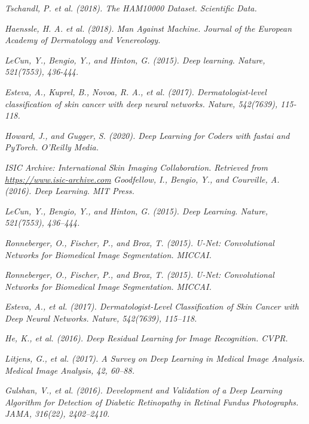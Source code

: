 \documentclass[a4paper,12pt]{report}
\begin{document}
\begin{spacing}{1.5}
\begin{thebibliography}{99}
 \emph{Tschandl, P. et al. (2018). The HAM10000 Dataset. Scientific Data.}

 \emph{Haenssle, H. A. et al. (2018). Man Against Machine. Journal of the European Academy of Dermatology and Venereology.}

 \emph{LeCun, Y., Bengio, Y., and Hinton, G. (2015). Deep learning. Nature, 521(7553), 436-444.}

 \emph{Esteva, A., Kuprel, B., Novoa, R. A., et al. (2017). Dermatologist-level classification of skin cancer with deep neural networks. Nature, 542(7639), 115-118.}

 \emph{Howard, J., and Gugger, S. (2020). Deep Learning for Coders with fastai and PyTorch. O'Reilly Media.}

 \emph{ISIC Archive: International Skin Imaging Collaboration. Retrieved from \url{https://www.isic-archive.com}}
 \emph{Goodfellow, I., Bengio, Y., and Courville, A. (2016). Deep Learning. MIT Press.}

 \emph{LeCun, Y., Bengio, Y., and Hinton, G. (2015). Deep Learning. Nature, 521(7553), 436–444.}

 \emph{Ronneberger, O., Fischer, P., and Brox, T. (2015). U-Net: Convolutional Networks for Biomedical Image Segmentation. MICCAI.}

 \emph{Ronneberger, O., Fischer, P., and Brox, T. (2015). U-Net: Convolutional Networks for Biomedical Image Segmentation. MICCAI.}

 \emph{Esteva, A., et al. (2017). Dermatologist-Level Classification of Skin Cancer with Deep Neural Networks. Nature, 542(7639), 115–118.}

 \emph{He, K., et al. (2016). Deep Residual Learning for Image Recognition. CVPR.}

 \emph{Litjens, G., et al. (2017). A Survey on Deep Learning in Medical Image Analysis. Medical Image Analysis, 42, 60–88.}

 \emph{Gulshan, V., et al. (2016). Development and Validation of a Deep Learning Algorithm for Detection of Diabetic Retinopathy in Retinal Fundus Photographs. JAMA, 316(22), 2402–2410.}


\end{thebibliography}
\end{spacing}
\end{document}
